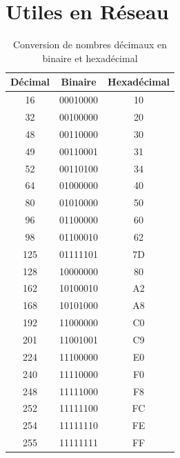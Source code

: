 \documentclass[12pt]{article}
\begin{document}
\section{Utiles en Réseau}

\begin{table}[h]
    \centering
    \begin{tabular}{|c|c|c|}
    \hline
    Décimal & Binaire & Hexadécimal \\
    \hline
    16  & 00010000 & 10 \\
    \hline
    32  & 00100000 & 20 \\
    \hline
    48  & 00110000 & 30 \\
    \hline
    49  & 00110001 & 31 \\
    \hline
    52  & 00110100 & 34 \\
    \hline
    64  & 01000000 & 40 \\
    \hline
    80  & 01010000 & 50 \\
    \hline
    96  & 01100000 & 60 \\
    \hline
    98  & 01100010 & 62 \\
    \hline
    125 & 01111101 & 7D \\
    \hline
    128 & 10000000 & 80 \\
    \hline
    162 & 10100010 & A2 \\
    \hline
    168 & 10101000 & A8 \\
    \hline
    192 & 11000000 & C0 \\
    \hline
    201 & 11001001 & C9 \\
    \hline
    224 & 11100000 & E0 \\
    \hline
    240 & 11110000 & F0 \\
    \hline
    248 & 11111000 & F8 \\
    \hline
    252 & 11111100 & FC \\
    \hline
    254 & 11111110 & FE \\
    \hline
    255 & 11111111 & FF \\
    \hline
    \end{tabular}
    \caption{Conversion de nombres décimaux en binaire et hexadécimal}
    \label{tab:conversion}
\end{table}
\end{document}
